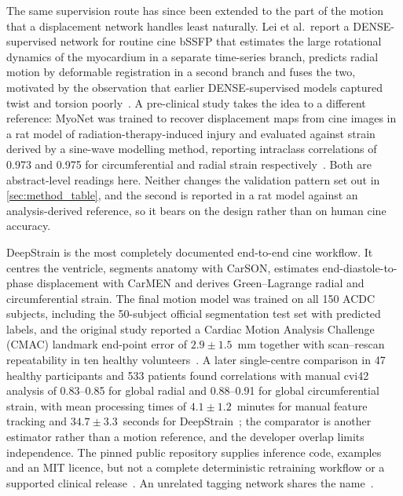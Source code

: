 The same supervision route has since been extended to the part of the motion that a displacement
network handles least naturally. Lei et al.\ report a DENSE-supervised network for routine cine
bSSFP that estimates the large rotational dynamics of the myocardium in a separate time-series
branch, predicts radial motion by deformable registration in a second branch and fuses the two,
motivated by the observation that earlier DENSE-supervised models captured twist and torsion
poorly~\citep{lei2025denserotation}. A pre-clinical study takes the idea to a different reference:
MyoNet was trained to recover displacement maps from cine images in a rat model of
radiation-therapy-induced injury and evaluated against strain derived by a sine-wave modelling
method, reporting intraclass correlations of 0.973 and 0.975 for circumferential and radial strain
respectively~\citep{an2026myonet}. Both are abstract-level readings here. Neither changes the
validation pattern set out in \cref{sec:method_table}, and the second is reported in a rat model
against an analysis-derived reference, so it bears on the design rather than on human cine accuracy.

DeepStrain is the most completely documented end-to-end cine workflow. It centres the ventricle,
segments anatomy with CarSON, estimates end-diastole-to-phase displacement with CarMEN and derives
Green--Lagrange radial and circumferential strain. The final motion model was trained on all 150
ACDC subjects, including the 50-subject official segmentation test set with predicted labels, and
the original study reported a Cardiac Motion Analysis Challenge (CMAC) landmark end-point error of
$2.9\pm1.5$~mm together with scan--rescan repeatability in ten healthy
volunteers~\citep{morales2021}. A later single-centre comparison in 47 healthy participants and 533
patients found correlations with manual cvi42 analysis of 0.83--0.85 for global radial and
0.88--0.91 for global circumferential strain, with mean processing times of $4.1\pm1.2$~minutes for
manual feature tracking and $34.7\pm3.3$~seconds for DeepStrain~\citep{morales2022comparison}; the
comparator is another estimator rather than a motion reference, and the developer overlap limits
independence. The pinned public repository supplies inference code, examples and an MIT licence, but not a
complete deterministic retraining workflow or a supported clinical release~\citep{deepstrainrepo}.
An unrelated tagging network shares the name~\citep{abdelmoniem2021}.

